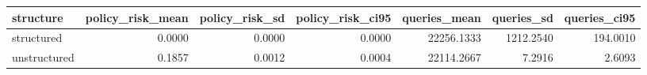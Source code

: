 \begin{tabular}{lrrrrrr}
\toprule
structure & policy_risk_mean & policy_risk_sd & policy_risk_ci95 & queries_mean & queries_sd & queries_ci95 \\
\midrule
structured & 0.0000 & 0.0000 & 0.0000 & 22256.1333 & 1212.2540 & 194.0010 \\
unstructured & 0.1857 & 0.0012 & 0.0004 & 22114.2667 & 7.2916 & 2.6093 \\
\bottomrule
\end{tabular}

